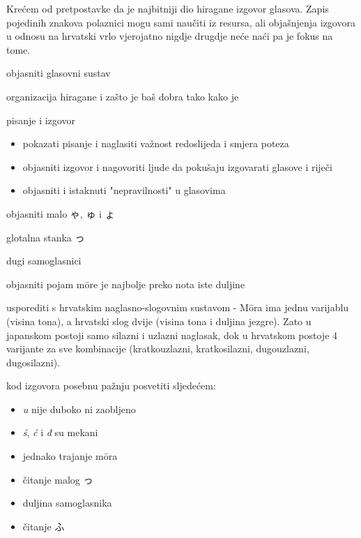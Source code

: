 
\author{autor}

	
	Krećem od pretpostavke da je najbitniji dio hiragane izgovor glasova. Zapis pojedinih znakova polaznici mogu sami naučiti iz resursa, ali objašnjenja izgovora u odnosu na hrvatski vrlo vjerojatno nigdje drugdje neće naći pa je fokus na tome.
	
	
	\begin{hyou}
		\item objasniti glasovni sustav
		\item organizacija hiragane i zašto je baš dobra tako kako je
		\item pisanje i izgovor
		\begin{itemize}
			\itemsep-5pt
			\item pokazati pisanje i naglasiti važnost redoslijeda i smjera poteza
			\item objasniti izgovor i nagovoriti ljude da pokušaju izgovarati glasove i riječi
			\item objasniti i istaknuti "nepravilnosti" u glasovima
		\end{itemize}
		\item objasniti malo ゃ, ゅ i ょ
		\item glotalna stanka っ
		\item dugi samoglasnici
	\end{hyou}

	\fukudai{Napomene}
	
	\begin{hyou}
		\item objasniti pojam m\={o}re je najbolje preko nota iste duljine
		\item usporediti s hrvatskim naglasno-slogovnim sustavom - M\={o}ra ima jednu varijablu (visina tona), a hrvatski slog dvije (visina tona i duljina jezgre). Zato u japanskom postoji samo silazni i uzlazni naglasak, dok u hrvatskom postoje 4 varijante za sve kombinacije (kratkouzlazni, kratkosilazni, dugouzlazni, dugosilazni).
		\item kod izgovora posebnu pažnju posvetiti sljedećem:
		\begin{itemize}
			\itemsep-5pt
			\item \textit{u} nije duboko ni zaobljeno
			\item \textit{\'{s}}, \textit{ć} i \textit{đ} su mekani
			\item jednako trajanje m\={o}ra
			\item čitanje malog っ
			\item duljina samoglasnika
			\item čitanje ふ
		\end{itemize}
	\end{hyou}

